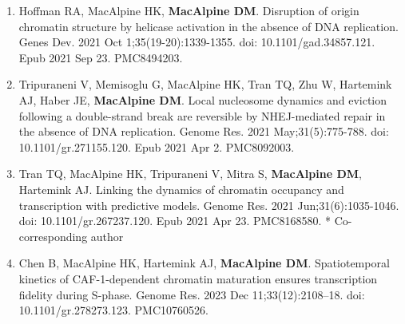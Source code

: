 \begin{statement}
\begin{enumerate}

\item Hoffman RA, MacAlpine HK, \textbf{MacAlpine DM}. Disruption of origin chromatin structure by helicase activation in the absence of DNA replication. Genes Dev. 2021 Oct 1;35(19-20):1339-1355. doi: 10.1101/gad.34857.121. Epub 2021 Sep 23. PMC8494203.

\item Tripuraneni V, Memisoglu G, MacAlpine HK, Tran TQ, Zhu W, Hartemink AJ, Haber JE, \textbf{MacAlpine DM}. Local nucleosome dynamics and eviction following a double-strand break are reversible by NHEJ-mediated repair in the absence of DNA replication. Genome Res. 2021 May;31(5):775-788. doi: 10.1101/gr.271155.120. Epub 2021 Apr 2. PMC8092003.

\item Tran TQ, MacAlpine HK, Tripuraneni V, Mitra S, \textbf{MacAlpine DM}, Hartemink AJ. Linking the dynamics of chromatin occupancy and transcription with predictive models. Genome Res. 2021 Jun;31(6):1035-1046. doi: 10.1101/gr.267237.120. Epub 2021 Apr 23. PMC8168580. * Co-corresponding author


\item Chen B, MacAlpine HK, Hartemink AJ, \textbf{MacAlpine DM}. Spatiotemporal kinetics of CAF-1-dependent chromatin maturation ensures transcription fidelity during S-phase. Genome Res. 2023 Dec 11;33(12):2108–18. doi: 10.1101/gr.278273.123. PMC10760526.
\end{enumerate}

\end{statement}
